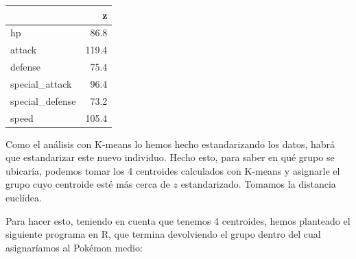 \documentclass[
  12pt,
]{extreport}
\begin{document}
\begin{table}[H]
\centering\begingroup\fontsize{11.5}{13.5}\selectfont

\begin{tabular}{lr}
\toprule
  & z\\
\midrule
hp & 86.8\\
attack & 119.4\\
defense & 75.4\\
special\_attack & 96.4\\
special\_defense & 73.2\\
\addlinespace
speed & 105.4\\
\bottomrule
\end{tabular}
\endgroup{}
\end{table}

Como el análisis con K-means lo hemos hecho estandarizando los datos,
habrá que estandarizar este nuevo individuo. Hecho esto, para saber en
qué grupo se ubicaría, podemos tomar los 4 centroides calculados con
K-means y asignarle el grupo cuyo centroide esté más cerca de \(z\)
estandarizado. Tomamos la distancia euclídea.

Para hacer esto, teniendo en cuenta que tenemos 4 centroides, hemos
planteado el siguiente programa en R, que termina devolviendo el grupo
dentro del cual asignaríamos al Pokémon medio:

\vspace{1cm}
\end{document}
